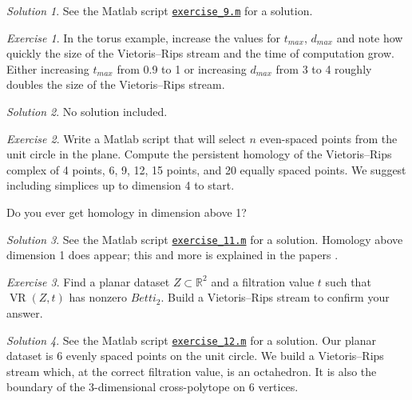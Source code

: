 \documentclass[amscd, amssymb, verbatim]{amsart}[12pt]
\theoremstyle{remark}
\theoremstyle{remark}
\newtheorem{exerciseSol}{Exercise}
\theoremstyle{remark}
\newtheorem*{solution}{Solution}
\DeclareMathOperator{\VR}{VR}
\newcommand{\R}{\mathbb{R}}
\begin{document}
\begin{solution}
See the Matlab script \href{https://github.com/appliedtopology/javaplex/tree/master/src/matlab/for_distribution/tutorial_solutions/exercise_9.m}{\texttt{exercise\_9.m}} for a solution.
\end{solution}

\begin{exerciseSol}
In the torus example, increase the values for $t_{max}$, $d_{max}$ and note how quickly the size of the Vietoris--Rips stream and the time of computation grow. Either increasing $t_{max}$ from 0.9 to 1 or increasing $d_{max}$ from 3 to 4 roughly doubles the size of the Vietoris--Rips stream.
\end{exerciseSol}

\begin{solution}
No solution included. 
\end{solution}

\begin{exerciseSol}
Write a Matlab script that will select $n$ even-spaced points from the unit circle in the plane. Compute the persistent homology of the Vietoris--Rips complex of 4 points, 6, 9, 12, 15 points, and 20 equally spaced points. We suggest including simplices up to dimension 4 to start.

Do you ever get homology in dimension above 1?
\end{exerciseSol}

\begin{solution}
See the Matlab script \href{https://github.com/appliedtopology/javaplex/tree/master/src/matlab/for_distribution/tutorial_solutions/exercise_11.m}{\texttt{exercise\_11.m}} for a solution. Homology above dimension 1 does appear; this and more is explained in the papers \cite{Adamaszek2013,AAFPP-J,AA-VRS1,AAM}.
\end{solution}

\begin{exerciseSol}
Find a planar dataset $Z \subset \R^2$ and a filtration value $t$ such that $\VR(Z,t)$ has nonzero $Betti_2$. Build a Vietoris--Rips stream to confirm your answer.
\end{exerciseSol}

\begin{solution}
See the Matlab script \href{https://github.com/appliedtopology/javaplex/tree/master/src/matlab/for_distribution/tutorial_solutions/exercise_12.m}{\texttt{exercise\_12.m}} for a solution. Our planar dataset is 6 evenly spaced points on the unit circle. We build a Vietoris--Rips stream which, at the correct filtration value, is an octahedron. It is also the boundary of the 3-dimensional cross-polytope on 6 vertices.
\end{solution}
\end{document}
